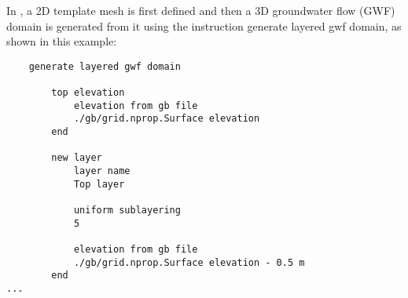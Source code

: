 \label{texfile:GWF}
In \mut, a 2D template mesh is first defined and then a 3D groundwater flow (GWF) domain is generated from it using the
instruction \textsf{generate layered gwf domain}, as shown in this example:
\begin{verbatim}
    generate layered gwf domain

        top elevation
            elevation from gb file
            ./gb/grid.nprop.Surface elevation
        end

        new layer
            layer name
            Top layer

            uniform sublayering
            5

            elevation from gb file
            ./gb/grid.nprop.Surface elevation - 0.5 m
        end
...
\end{verbatim}


